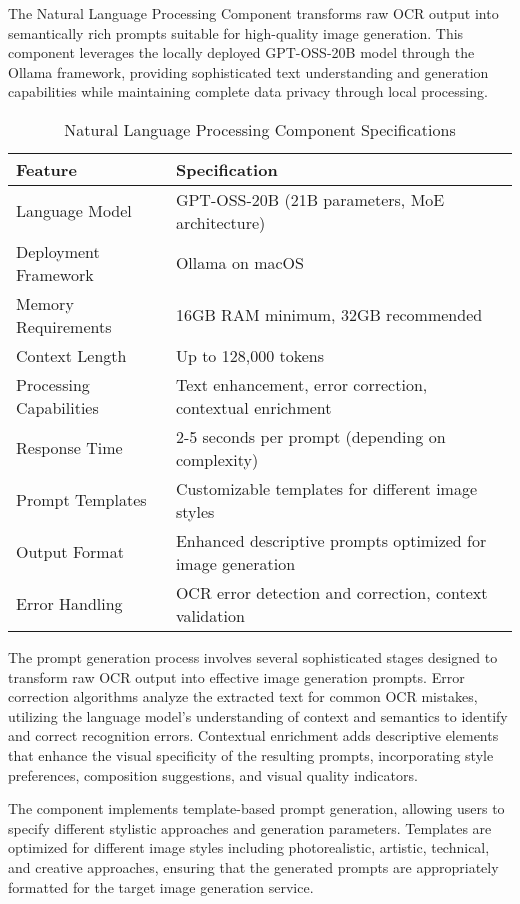 The Natural Language Processing Component transforms raw OCR output into semantically rich prompts suitable for high-quality image generation. This component leverages the locally deployed GPT-OSS-20B model through the Ollama framework, providing sophisticated text understanding and generation capabilities while maintaining complete data privacy through local processing.

\begin{table}[H]
\centering
\caption{Natural Language Processing Component Specifications}
\label{tab:nlp_specifications}
\begin{tabular}{|l|p{8cm}|}
\hline
\textbf{Feature} & \textbf{Specification} \\
\hline
Language Model & GPT-OSS-20B (21B parameters, MoE architecture) \\
\hline
Deployment Framework & Ollama on macOS \\
\hline
Memory Requirements & 16GB RAM minimum, 32GB recommended \\
\hline
Context Length & Up to 128,000 tokens \\
\hline
Processing Capabilities & Text enhancement, error correction, contextual enrichment \\
\hline
Response Time & 2-5 seconds per prompt (depending on complexity) \\
\hline
Prompt Templates & Customizable templates for different image styles \\
\hline
Output Format & Enhanced descriptive prompts optimized for image generation \\
\hline
Error Handling & OCR error detection and correction, context validation \\
\hline
\end{tabular}
\end{table}

The prompt generation process involves several sophisticated stages designed to transform raw OCR output into effective image generation prompts. Error correction algorithms analyze the extracted text for common OCR mistakes, utilizing the language model's understanding of context and semantics to identify and correct recognition errors. Contextual enrichment adds descriptive elements that enhance the visual specificity of the resulting prompts, incorporating style preferences, composition suggestions, and visual quality indicators.

The component implements template-based prompt generation, allowing users to specify different stylistic approaches and generation parameters. Templates are optimized for different image styles including photorealistic, artistic, technical, and creative approaches, ensuring that the generated prompts are appropriately formatted for the target image generation service.

